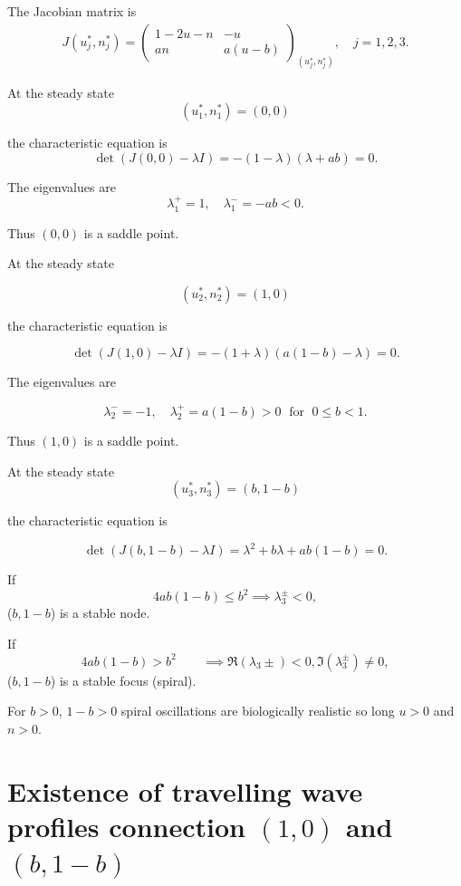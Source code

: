 \documentclass[
  letterpaper,
  DIV=11,
  numbers=noendperiod]{scrreprt}
\theoremstyle{definition}
\theoremstyle{plain}
\theoremstyle{plain}
\theoremstyle{remark}
\begin{document}
The Jacobian matrix is \[
\begin{aligned}
J(u_j^\ast, n^\ast_j) = 
\begin{pmatrix}
1-2u -n & -u \\
an &a(u-b)
\end{pmatrix}_{(u^\ast_j, n^\ast_j)}, \quad j = 1,2,3.
\end{aligned}
\]

At the steady state \[
(u_1^\ast, n_1^\ast)= (0,0)
\]

the characteristic equation is \[
\det(J (0,0) - \lambda I) = - (1- \lambda)(\lambda+ ab) = 0.
\]

The eigenvalues are \[
\lambda_1^+ = 1, \quad \lambda_1^- = - ab <0.
\]

Thus \((0,0)\) is a saddle point.

At the steady state

\[
(u_2^\ast, n_2^\ast)= (1,0)
\]

the characteristic equation is

\[
\det(J (1,0) - \lambda I) = - (1+ \lambda)(a(1-b)- \lambda) = 0.
\]

The eigenvalues are

\[
\lambda_2^- =- 1, \quad \lambda_2^+ = a(1-b) >0 \; \text{ for } \; 0 \leq b <1.
\]

Thus \((1,0)\) is a saddle point.

At the steady state \[
(u_3^\ast, n_3^\ast)= (b,1-b)
\]

the characteristic equation is

\[
\det(J (b,1-b) - \lambda I) =\lambda^2 + b \lambda + ab(1-b) = 0.
\]

If \[
4 ab (1-b) \leq b^2  \implies \lambda_3^{\pm} < 0,
\] (\(b,1-b\)) is a stable node.

If\\
\[
4 ab (1-b) > b^2 \qquad \implies  \Re(\lambda_3{\pm}) < 0,  \Im(\lambda_3^{\pm}) \neq 0,
\] (\(b,1-b\)) is a stable focus (spiral).

For \(b>0\), \(1-b>0\) spiral oscillations are biologically realistic so
long \(u>0\) and \(n>0\).

\hypertarget{existence-of-travelling-wave-profiles-connection-10-and-b1-b}{%
\section{\texorpdfstring{Existence of travelling wave profiles
connection \((1,0)\) and
\((b,1-b)\)}{Existence of travelling wave profiles connection (1,0) and (b,1-b)}}\label{existence-of-travelling-wave-profiles-connection-10-and-b1-b}}
\end{document}
